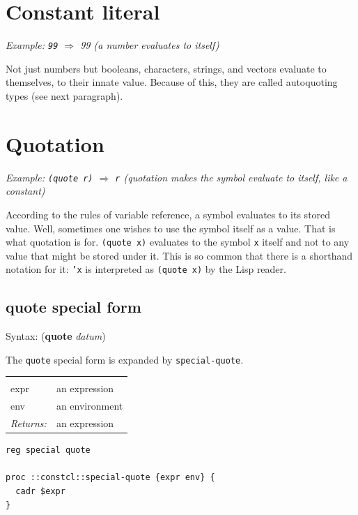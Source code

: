 \documentclass[twoside,9pt]{report}
\begin{document}
\section{Constant literal}
\label{constant-literal}


\emph{Example: \texttt{99} $\Rightarrow$ 99 (a number evaluates to itself)}


Not just numbers but booleans, characters, strings, and vectors evaluate to themselves, to their innate value. Because of this, they are called autoquoting types (see next paragraph).

\section{Quotation}
\label{quotation}


\emph{Example: \texttt{(quote r)} $\Rightarrow$ \texttt{r} (quotation makes the symbol evaluate to itself, like a constant)}


According to the rules of variable reference, a symbol evaluates to its stored value. Well, sometimes one wishes to use the symbol itself as a value. That is what quotation is for. \texttt{(quote x)} evaluates to the symbol \texttt{x} itself and not to any value that might be stored under it. This is so common that there is a shorthand notation for it: \texttt{'x} is interpreted as \texttt{(quote x)} by the Lisp reader.

\subsection{quote special form}
\label{quote-special-form}


Syntax: (\textbf{quote} \emph{datum})


The \texttt{quote} special form is expanded by \texttt{special-quote}.

\noindent\begin{tabular}{ |p{1.9cm} p{8cm}| }
\hline
\rowcolor[HTML]{CCCCCC} \multicolumn{2}{|l|}{\bf special-quote (internal)} \\
expr & an expression \\
env & an environment \\
\textit{Returns:} & an expression \\
\hline
\end{tabular}
\begin{lstlisting}
reg special quote

proc ::constcl::special-quote {expr env} {
  cadr $expr
}
\end{lstlisting}
\end{document}
